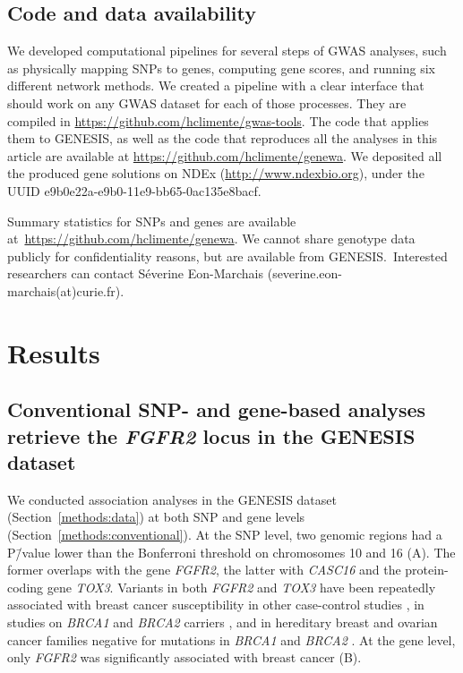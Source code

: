 \documentclass[10pt,letterpaper]{article}
\begin{document}
\subsection{Code and data availability}
\label{methods:code}

We developed computational pipelines for several steps of GWAS analyses, such as physically mapping SNPs to genes, computing gene scores, and running six different network methods. We created a pipeline with a clear interface that should work on any GWAS dataset for each of those processes. They are compiled in \url{https://github.com/hclimente/gwas-tools}. The code that applies them to GENESIS, as well as the code that reproduces all the analyses in this article are available at \url{https://github.com/hclimente/genewa}. We deposited all the produced gene solutions on NDEx (\url{http://www.ndexbio.org}), under the UUID e9b0e22a-e9b0-11e9-bb65-0ac135e8bacf.

Summary statistics for SNPs and genes are available at \url{https://github.com/hclimente/genewa}. We cannot share genotype data publicly for confidentiality reasons, but are available from GENESIS. Interested researchers can contact Séverine Eon-Marchais (severine.eon-marchais(at)curie.fr).

\section{Results}

\subsection{Conventional SNP- and gene-based analyses retrieve the \emph{FGFR2} locus in the GENESIS dataset}
\label{results:conventional}

We conducted association analyses in the GENESIS dataset (Section~\ref{methods:data}) at both SNP and gene levels (Section~\ref{methods:conventional}). At the SNP level, two genomic regions had a P\=/value lower than the Bonferroni threshold on chromosomes 10 and 16 (A). The former overlaps with the gene \emph{FGFR2}, the latter with \emph{CASC16} and the protein-coding gene \emph{TOX3}. Variants in both \emph{FGFR2} and \emph{TOX3} have been repeatedly associated with breast cancer susceptibility in other case-control studies \cite{Michailidou2017}, in studies on \emph{BRCA1} and \emph{BRCA2} carriers \cite{Mulligan2011}, and in hereditary breast and ovarian cancer families negative for mutations in \emph{BRCA1} and \emph{BRCA2} \cite{rinella_genetic_2013}. At the gene level, only \emph{FGFR2} was significantly associated with breast cancer (B).
\end{document}

